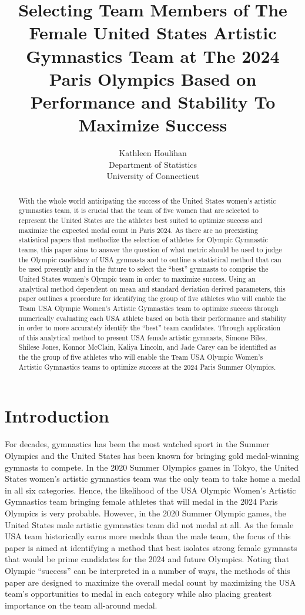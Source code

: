 \documentclass[12pt]{article}
\title{Selecting Team Members of The Female United States Artistic Gymnastics Team at The 2024 Paris Olympics 
Based on Performance and Stability To Maximize Success}
\author{Kathleen Houlihan\\
  Department of Statistics\\
  University of Connecticut
}
\begin{document}
\maketitle

\begin{abstract}
    
  With the whole world anticipating the success of the United States women's artistic gymnastics team, 
  it is crucial that the team of five women that are selected to represent the United States 
  are the athletes best suited to optimize success and maximize the expected medal count in Paris 2024. As there 
  are no preexisting statistical papers that methodize the selection of athletes for Olympic Gymnastic teams, 
  this paper aims to answer the question of what metric should be used to judge the Olympic candidacy of USA 
  gymnasts and to outline a statistical method that can be used presently and in the future to select the ``best'' 
  gymnasts to comprise the United States women's Olympic team in order to maximize success. Using an analytical 
  method dependent on mean and standard deviation derived parameters, this paper outlines a procedure for identifying 
  the group of five athletes who will enable the Team USA Olympic Women’s Artistic Gymnastics team to optimize 
  success through numerically evaluating each USA athlete based on both their performance and stability in order to 
  more accurately identify the ``best'' team candidates. Through application of this analytical method to present 
  USA female artistic gymnasts, Simone Biles, Shilese Jones, Konnor McClain, Kaliya Lincoln, and Jade Carey can be 
  identified as the the group of five athletes who will enable the Team USA Olympic Women’s Artistic Gymnastics 
  teams to optimize success at the 2024 Paris Summer Olympics.

\end{abstract}

\section{Introduction}
\label{sec:intro}

For decades, gymnastics has been the most watched sport in the Summer Olympics and the United 
States has been known for bringing gold medal-winning gymnasts to compete. In the 2020 
Summer Olympics games in Tokyo, the United States women's artistic gymnastics team was the only team to take 
home a medal in all six categories. Hence, the likelihood of the USA Olympic Women’s Artistic Gymnastics 
team bringing female athletes that will medal in the 2024 Paris Olympics is very probable. 
However, in the 2020 Summer Olympic games, the United States 
male artistic gymnastics team did not medal at all. As the female USA team historically earns more medals than 
the male team, the focus of this paper is aimed at identifying a method that best isolates strong female gymnasts 
that would be prime candidates for the 2024 and future Olympics. Noting that Olympic ``success'' can be interpreted in a number 
of ways, the methods of this 
paper are designed to maximize the overall medal count by maximizing the USA team's opportunities to medal in each 
category while also placing greatest importance on the team all-around medal. 
\end{document}
